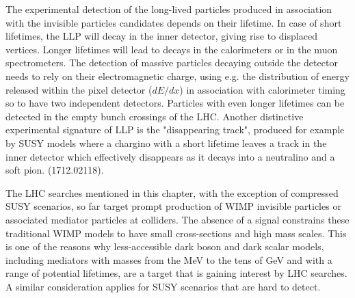 The experimental detection of the long-lived particles produced in association with the invisible particles candidates depends on their lifetime. 
In case of short lifetimes, the LLP will decay in the inner detector, giving rise to displaced vertices. Longer lifetimes will lead
to decays in the calorimeters or in the muon spectrometers. The detection of massive particles decaying outside the detector needs to rely
on their electromagnetic charge, using e.g. the distribution of energy released within the pixel detector ($dE/dx$) in association
with calorimeter timing so to have two independent detectors. Particles with even longer lifetimes can be detected in the empty bunch
crossings of the LHC. %
Another distinctive experimental signature of LLP is the "disappearing track", produced for example by SUSY models where a chargino
with a short lifetime leaves a track in the inner detector which effectively disappears as it decays into a neutralino and a soft pion. 
(1712.02118). 


The LHC searches mentioned in this chapter, with the exception of compressed SUSY scenarios, 
so far target prompt production of WIMP invisible particles or associated mediator particles at colliders. 
The absence of a signal constrains these traditional WIMP models to have small cross-sections and high mass scales. 
This is one of the reasons why less-accessible dark boson and dark scalar models, including mediators with masses from the MeV to the tens
of GeV and with a range of potential lifetimes, are a target that is gaining interest by LHC searches. A similar consideration
applies for SUSY scenarios that are hard to detect. 




